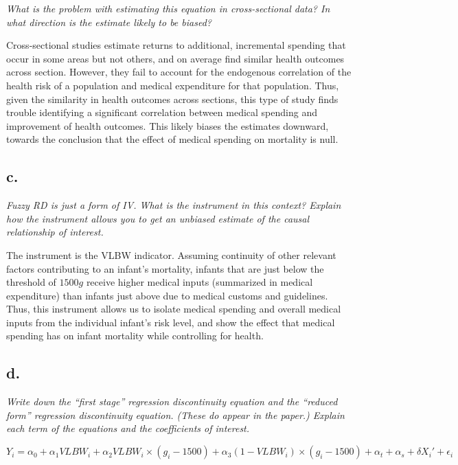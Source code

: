 \documentclass[
]{article}
\begin{document}
\textit{What is the problem with estimating this equation in cross-sectional data? In what direction is the estimate likely to be biased?}

Cross-sectional studies estimate returns to additional, incremental
spending that occur in some areas but not others, and on average find
similar health outcomes across section. However, they fail to account
for the endogenous correlation of the health risk of a population and
medical expenditure for that population. Thus, given the similarity in
health outcomes across sections, this type of study finds trouble
identifying a significant correlation between medical spending and
improvement of health outcomes. This likely biases the estimates
downward, towards the conclusion that the effect of medical spending on
mortality is null.

\hypertarget{c.}{%
\subsection{c.~}\label{c.}}

\textit{Fuzzy RD is just a form of IV. What is the instrument in this context? Explain how the instrument allows you to get an unbiased estimate of the causal relationship of interest.}

The instrument is the VLBW indicator. Assuming continuity of other
relevant factors contributing to an infant's mortality, infants that are
just below the threshold of \(1500g\) receive higher medical inputs
(summarized in medical expenditure) than infants just above due to
medical customs and guidelines. Thus, this instrument allows us to
isolate medical spending and overall medical inputs from the individual
infant's risk level, and show the effect that medical spending has on
infant mortality while controlling for health.

\hypertarget{d.}{%
\subsection{d.~}\label{d.}}

\textit{Write down the “first stage” regression discontinuity equation and the “reduced form” regression discontinuity equation. (These do appear in the paper.) Explain each term of the equations and the coefficients of interest.}

\[Y_i = \alpha_0 + \alpha_1 VLBW_i + \alpha_2 VLBW_i \times (g_i - 1500) + \alpha _3 (1-VLBW_i) \times (g_i - 1500) + \alpha_t + \alpha_s + \delta X_i ' + \epsilon_i\]
\end{document}
